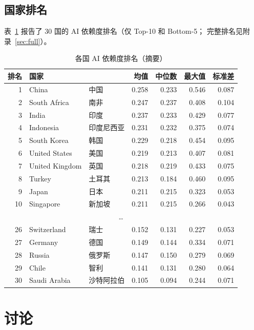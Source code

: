 \documentclass[11pt,a4paper]{article}
\begin{document}
\subsection{国家排名}

表~\ref{tab:ranking} 报告了 30 国的 AI 依赖度排名（仅 Top-10 和 Bottom-5；
完整排名见附录~\ref{sec:full}）。

\begin{table}[H]
\centering
\caption{各国 AI 依赖度排名（摘要）}
\label{tab:ranking}
\begin{tabular}{rllrrrr}
\toprule
\textbf{排名} & \textbf{国家} & & \textbf{均值} & \textbf{中位数} & \textbf{最大值} & \textbf{标准差} \\
\midrule
1 & China & 中国 & 0.258 & 0.233 & 0.546 & 0.087 \\
2 & South Africa & 南非 & 0.247 & 0.237 & 0.408 & 0.104 \\
3 & India & 印度 & 0.237 & 0.233 & 0.429 & 0.077 \\
4 & Indonesia & 印度尼西亚 & 0.231 & 0.232 & 0.375 & 0.074 \\
5 & South Korea & 韩国 & 0.229 & 0.218 & 0.454 & 0.095 \\
6 & United States & 美国 & 0.219 & 0.213 & 0.407 & 0.081 \\
7 & United Kingdom & 英国 & 0.218 & 0.219 & 0.433 & 0.075 \\
8 & Turkey & 土耳其 & 0.213 & 0.184 & 0.460 & 0.095 \\
9 & Japan & 日本 & 0.211 & 0.215 & 0.323 & 0.053 \\
10 & Singapore & 新加坡 & 0.211 & 0.215 & 0.266 & 0.043 \\
\midrule
\multicolumn{7}{c}{\dots} \\
\midrule
26 & Switzerland & 瑞士 & 0.152 & 0.131 & 0.227 & 0.053 \\
27 & Germany & 德国 & 0.149 & 0.144 & 0.334 & 0.071 \\
28 & Russia & 俄罗斯 & 0.147 & 0.150 & 0.279 & 0.069 \\
29 & Chile & 智利 & 0.141 & 0.131 & 0.280 & 0.064 \\
30 & Saudi Arabia & 沙特阿拉伯 & 0.105 & 0.094 & 0.244 & 0.071 \\
\bottomrule
\end{tabular}
\end{table}

\section{讨论}
\end{document}
